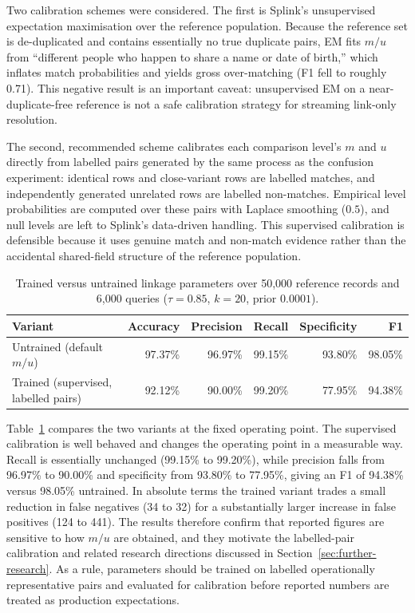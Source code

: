 \documentclass[conference]{IEEEtran}
\begin{document}
Two calibration schemes were considered. The first is Splink's unsupervised expectation maximisation over the reference population. Because the reference set is de-duplicated and contains essentially no true duplicate pairs, EM fits $m/u$ from ``different people who happen to share a name or date of birth,'' which inflates match probabilities and yields gross over-matching (F1 fell to roughly 0.71). This negative result is an important caveat: unsupervised EM on a near-duplicate-free reference is not a safe calibration strategy for streaming link-only resolution.

The second, recommended scheme calibrates each comparison level's $m$ and $u$ directly from labelled pairs generated by the same process as the confusion experiment: identical rows and close-variant rows are labelled matches, and independently generated unrelated rows are labelled non-matches. Empirical level probabilities are computed over these pairs with Laplace smoothing ($0.5$), and null levels are left to Splink's data-driven handling. This supervised calibration is defensible because it uses genuine match and non-match evidence rather than the accidental shared-field structure of the reference population.

\begin{table}[t]
\centering
\caption{Trained versus untrained linkage parameters over 50,000 reference records and 6,000 queries ($\tau=0.85$, $k=20$, prior $0.0001$).}
\label{tab:mu-train-untrain}
\begin{tabular}{lrrrrr}
\toprule
Variant & Accuracy & Precision & Recall & Specificity & F1 \\
\midrule
Untrained (default $m/u$) & 97.37\% & 96.97\% & 99.15\% & 93.80\% & 98.05\% \\
Trained (supervised, labelled pairs) & 92.12\% & 90.00\% & 99.20\% & 77.95\% & 94.38\% \\
\bottomrule
\end{tabular}
\end{table}

Table~\ref{tab:mu-train-untrain} compares the two variants at the fixed operating point. The supervised calibration is well behaved and changes the operating point in a measurable way. Recall is essentially unchanged (99.15\% to 99.20\%), while precision falls from 96.97\% to 90.00\% and specificity from 93.80\% to 77.95\%, giving an F1 of 94.38\% versus 98.05\% untrained. In absolute terms the trained variant trades a small reduction in false negatives (34 to 32) for a substantially larger increase in false positives (124 to 441). The results therefore confirm that reported figures are sensitive to how $m/u$ are obtained, and they motivate the labelled-pair calibration and related research directions discussed in Section~\ref{sec:further-research}. As a rule, parameters should be trained on labelled operationally representative pairs and evaluated for calibration before reported numbers are treated as production expectations.
\end{document}
